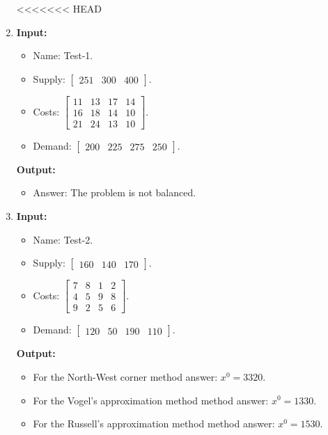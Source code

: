 \documentclass{article}
\begin{document}
\begin{enumerate}[label={(\arabic*)}, itemsep=0.25in]
<<<<<<< HEAD
\item \textbf{Input:}
\begin{itemize}
\item Name: Test-1.
\item Supply: \(\begin{bmatrix} 251 & 300 & 400 \end{bmatrix}\).
\item Costs: \(\begin{bmatrix}
11 & 13 & 17 & 14 \\
16 & 18 & 14 & 10 \\
21 & 24 & 13 & 10
\end{bmatrix}\).
\item Demand: \(\begin{bmatrix} 200 & 225 & 275 & 250 \end{bmatrix}\).
\end{itemize}
\textbf{Output:}
\begin{itemize}
\item Answer: The problem is not balanced.
\end{itemize}

\item \textbf{Input:}
\begin{itemize}
\item Name: Test-2.
\item Supply: \(\begin{bmatrix} 160 & 140 & 170 \end{bmatrix}\).
\item Costs: \(\begin{bmatrix}
7 & 8 & 1 & 2 \\
4 & 5 & 9 & 8 \\
9 & 2 & 5 & 6
\end{bmatrix}\).
\item Demand: \(\begin{bmatrix} 120 & 50 & 190 & 110 \end{bmatrix}\).
\end{itemize}
\textbf{Output:}
\begin{itemize}
\item For the North-West corner method answer: \(x^0 = 3320\).
\item For the Vogel’s approximation method method answer: \(x^0 = 1330\).
\item For the Russell’s approximation method method answer: \(x^0 = 1530\).
\end{itemize}


\end{enumerate}
\end{document}
